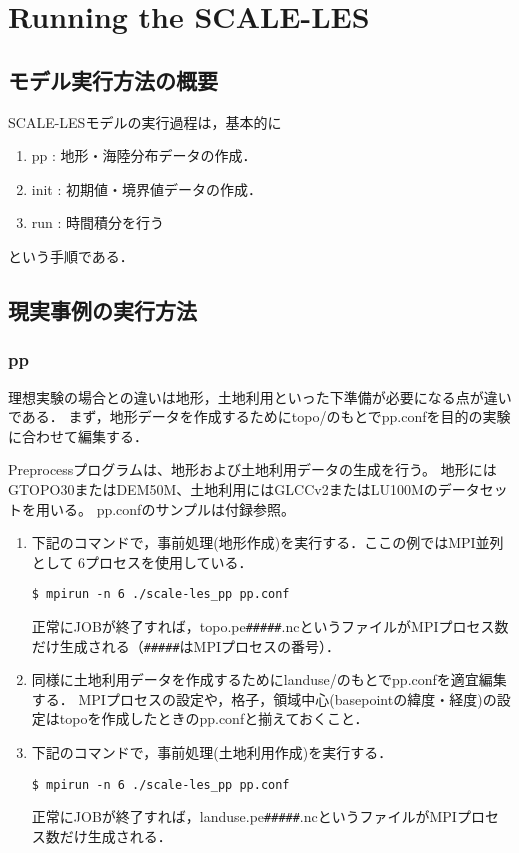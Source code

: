 \section{Running the SCALE-LES}

\subsection{モデル実行方法の概要}
SCALE-LESモデルの実行過程は，基本的に
\begin{enumerate}
\item pp : 地形・海陸分布データの作成．
\item init : 初期値・境界値データの作成．
\item run : 時間積分を行う
\end{enumerate}
という手順である．


\subsection{現実事例の実行方法}
\subsubsection{pp}
理想実験の場合との違いは地形，土地利用といった下準備が必要になる点が違いである．
まず，地形データを作成するためにtopo/のもとでpp.confを目的の実験に合わせて編集する．

Preprocessプログラムは、地形および土地利用データの生成を行う。
地形にはGTOPO30またはDEM50M、土地利用にはGLCCv2またはLU100Mのデータセットを用いる。
pp.confのサンプルは付録参照。

\begin{enumerate}
\item 下記のコマンドで，事前処理(地形作成)を実行する．ここの例ではMPI並列として
6プロセスを使用している．
\begin{verbatim}
$ mpirun -n 6 ./scale-les_pp pp.conf
\end{verbatim}
正常にJOBが終了すれば，topo.pe\verb|#####|.ncというファイルがMPIプロセス数だけ生成される（\verb|#####|はMPIプロセスの番号）．

\item 同様に土地利用データを作成するためにlanduse/のもとでpp.confを適宜編集する．
MPIプロセスの設定や，格子，領域中心(basepointの緯度・経度)の設定はtopoを作成したときのpp.confと揃えておくこと．

\item 下記のコマンドで，事前処理(土地利用作成)を実行する．
\begin{verbatim}
$ mpirun -n 6 ./scale-les_pp pp.conf
\end{verbatim}
正常にJOBが終了すれば，landuse.pe\verb|#####|.ncというファイルがMPIプロセス数だけ生成される．
\end{enumerate}


